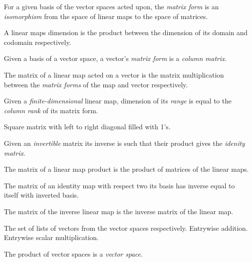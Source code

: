 \begin{multicols}{3}
  For a given basis of the vector spaces acted upon, the \textit{matrix form} is an
  \textit{isomorphism} from the space of linear maps to the space of matrices.

  A linear maps dimension is the product between the dimension of its domain and codomain respectively.

  Given a basis of a vector space, a vector's \textit{matrix form} is a \textit{column matrix}.

  
  The matrix of a linear map acted on a vector is the matrix multiplication between
  the \textit{matrix forms} of the map and vector respectively.
  
  Given a \textit{finite-dimensional} linear map,
  dimension of its \textit{range} is equal to the \textit{column rank} of its matrix form.
  
  Square matrix with left to right diagonal filled with 1's.

  Given an \textit{invertible} matrix its inverse is such that their product gives the \textit{idenity matrix}.

  The matrix of a linear map product is the product of matrices of the linear maps.
  
  The matrix of an identity map with respect two its basis
  has inverse equal to itself with inverted basis.
  
  
  The matrix of the inverse linear map is the inverse matrix of the linear map.


  The set of lists of vectors from the vector spaces respectively.
  Entrywise addition.
  Entrywise scalar multiplication.

  The product of vector spaces is a \textit{vector space}.


\end{multicols}
